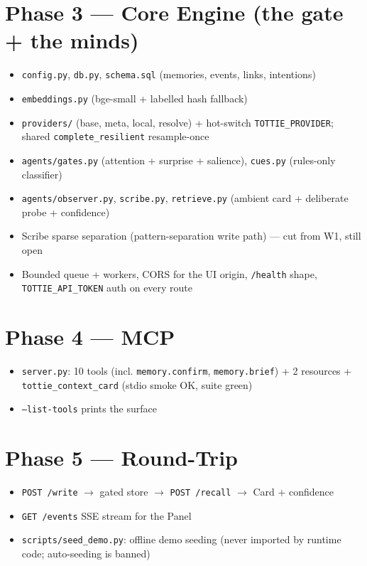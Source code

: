 \section{Phase 3 --- Core Engine (the gate + the minds)}
\begin{itemize}
  \item[$\boxtimes$] \texttt{config.py}, \texttt{db.py}, \texttt{schema.sql} (memories, events, links, intentions)
  \item[$\boxtimes$] \texttt{embeddings.py} (bge-small + labelled hash fallback)
  \item[$\boxtimes$] \texttt{providers/} (base, meta, local, resolve) + hot-switch \texttt{TOTTIE\_PROVIDER}; shared \texttt{complete\_resilient} resample-once
  \item[$\boxtimes$] \texttt{agents/gates.py} (attention + surprise + salience), \texttt{cues.py} (rules-only classifier)
  \item[$\boxtimes$] \texttt{agents/observer.py}, \texttt{scribe.py}, \texttt{retrieve.py} (ambient card + deliberate probe + confidence)
  \item[$\square$] Scribe sparse separation (pattern-separation write path) --- cut from W1, still open
  \item[$\boxtimes$] Bounded queue + workers, CORS for the UI origin, \texttt{/health} shape, \texttt{TOTTIE\_API\_TOKEN} auth on every route
\end{itemize}

\section{Phase 4 --- MCP}
\begin{itemize}
  \item[$\boxtimes$] \texttt{server.py}: 10 tools (incl. \texttt{memory.confirm}, \texttt{memory.brief}) + 2 resources + \texttt{tottie\_context\_card} (stdio smoke OK, suite green)
  \item[$\boxtimes$] \texttt{--list-tools} prints the surface
\end{itemize}

\section{Phase 5 --- Round-Trip}
\begin{itemize}
  \item[$\boxtimes$] \texttt{POST /write} $\rightarrow$ gated store $\rightarrow$ \texttt{POST /recall} $\rightarrow$ Card + confidence
  \item[$\boxtimes$] \texttt{GET /events} SSE stream for the Panel
  \item[$\boxtimes$] \texttt{scripts/seed\_demo.py}: offline demo seeding (never imported by runtime code; auto-seeding is banned)
\end{itemize}

